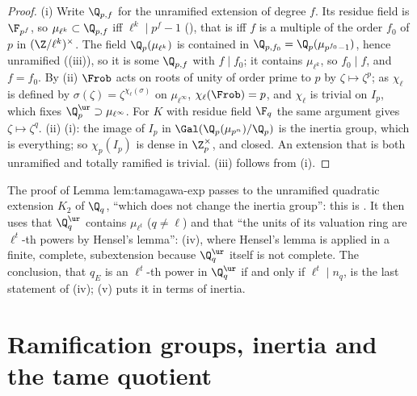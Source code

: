 \begin{proof}
(i) Write $\Q_{p,f}$ for the unramified extension of degree $f$. Its residue field is $\F_{p^f}$, so $\mu_{\ell^k}\subset\Q_{p,f}$ iff $\ell^k\mid p^f-1$
(), that is iff $f$ is a multiple of the order $f_0$ of $p$ in $(\Z/\ell^k)^\times$. The field $\Q_p(\mu_{\ell^k})$ is contained in
$\Q_{p,f_0}=\Q_p(\mu_{p^{f_0}-1})$, hence unramified ((iii)), so it is some $\Q_{p,f}$ with $f\mid f_0$; it contains $\mu_{\ell^k}$, so
$f_0\mid f$, and $f=f_0$. By (ii) $\Frob$ acts on roots of unity of order prime to $p$ by $\zeta\mapsto\zeta^p$; as
$\chi_\ell$ is defined by $\sigma(\zeta)=\zeta^{\chi_\ell(\sigma)}$ on $\mu_{\ell^\infty}$, $\chi_\ell(\Frob)=p$, and $\chi_\ell$ is trivial on $I_p$, which fixes
$\Q_p^{\ur}\supset\mu_{\ell^\infty}$. For $K$ with residue field $\F_q$ the same argument gives $\zeta\mapsto\zeta^q$. (ii) (i): the image of $I_p$ in
$\Gal(\Q_p(\mu_{p^n})/\Q_p)$ is the inertia group, which is everything; so $\chi_p(I_p)$ is dense in $\Z_p^\times$, and closed. An extension that is both
unramified and totally ramified is trivial. (iii) follows from (i).
\end{proof}

\begin{paperlink}\label{pl:local:tamagawa-exp-ur}
The proof of Lemma lem:tamagawa-exp passes to the unramified quadratic extension $K_2$ of $\Q_q$, ``which does not change the inertia group'':
this is . It then uses that $\Q_q^{\ur}$ contains $\mu_{\ell^t}$ ($q\ne\ell$) and that ``the units of its valuation
ring are $\ell^t$-th powers by Hensel's lemma'': (iv), where Hensel's lemma is applied in a finite, complete, subextension
because $\Q_q^{\ur}$ itself is not complete. The conclusion, that $q_E$ is an $\ell^t$-th power in $\Q_q^{\ur}$ if and only if $\ell^t\mid n_q$, is the last statement of
(iv); (v) puts it in terms of inertia.
\end{paperlink}

\section{Ramification groups, inertia and the tame quotient}\label{sec:local:ram}


